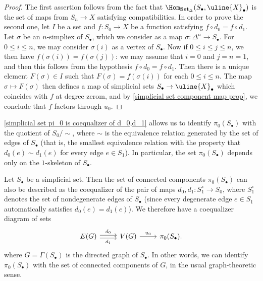 \begin{proof}
The first assertion follows from the fact that $\Hom_{\mathbf{Set}_\Delta}(S_\bullet,\uline{X}_\bullet)$ is the set of maps from $S_n\to X$ satisfying compatibilities. In order to prove the second one, let $I$ be a set and $f:S_0\to X$ be a function satisfying $f\circ d_0=f\circ d_1$. Let $\sigma$ be an $n$-simpliex of $S_\bullet$, which we consider as a map $\sigma:\Delta^n\to S_\bullet$. For $0\leq i\leq n$, we may consider $\sigma(i)$ as a vertex of $S_\bullet$. Now if $0\leq i\leq j\leq n$, we then have $f(\sigma(i))=f(\sigma(j))$: we may assume that $i=0$ and $j=n=1$, and then this follows from the hypothesis $f\circ d_0=f\circ d_1$. Then there is a unique element $F(\sigma)\in I$ such that $F(\sigma)=f(\sigma(i))$ for each $0\leq i\leq n$. The map $\sigma\mapsto F(\sigma)$ then defines a map of simplicial sets $S_\bullet\to\uline{X}_\bullet$ which coincides with $f$ at degree zerom, and by \cref{simplicial set component map prop}, we conclude that $f$ factors through $u_0$.
\end{proof}
\begin{remark}\label{simplicial set pi_0 is quotient of d_0,d_1 relation}
\cref{simplicial set pi_0 is coequalizer of d_0,d_1} allows us to identify $\pi_0(S_\bullet)$ with the quotient of $S_0/\sim$, where $\sim$ is the equivalence relation generated by the set of edges of $S_\bullet$ (that is, the smallest equivalence relation with the property that $d_0(e)\sim d_1(e)$ for every edge $e\in S_1$). In particular, the set $\pi_0(S_\bullet)$ depends only on the $1$-skeleton of $S_\bullet$.
\end{remark}
\begin{remark}\label{simplicial set pi_0 is equivalent class of vertex}
Let $S_\bullet$ be a simplicial set. Then the set of connected components $\pi_0(S_\bullet)$ can also be described as the coequalizer of the pair of maps $d_0,d_1:S_1^{\circ}\to S_0$, where $S_1^{\circ}$ denotes the set of nondegenerate edges of $S_\bullet$ (since every degenerate edge $e\in S_1$ automatically satisfies $d_0(e)=d_1(e)$). We therefore have a coequalizer diagram of sets
\[\begin{tikzcd}
E(G)\ar[r,shift left=2pt,"d_0"]\ar[r,shift right=2pt,swap,"d_1"]&V(G)\ar[r,"u_0"]&\pi_0(S_\bullet).
\end{tikzcd}\]
where $G=\Gamma(S_\bullet)$ is the directed graph of $S_\bullet$. In other words, we can identify $\pi_0(S_\bullet)$ with the set of connected components of $G$, in the usual graph-theoretic sense. 
\end{remark}
